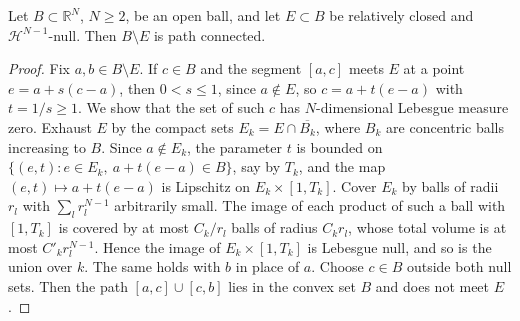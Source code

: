 \begin{lemma}\label{lem:thin-set-path-connectivity}
Let $B\subset\mathbb R^N$, $N\geq2$, be an open ball, and let $E\subset B$ be relatively closed and $\mathcal H^{N-1}$-null. Then $B\setminus E$ is path connected.
\end{lemma}
\begin{proof}
Fix $a,b\in B\setminus E$. If $c\in B$ and the segment $[a,c]$ meets $E$ at a point $e=a+s(c-a)$, then $0<s\leq1$, since $a\notin E$, so $c=a+t(e-a)$ with $t=1/s\geq1$. We show that the set of such $c$ has $N$-dimensional Lebesgue measure zero. Exhaust $E$ by the compact sets $E_k=E\cap\overline{B_k}$, where $B_k$ are concentric balls increasing to $B$. Since $a\notin E_k$, the parameter $t$ is bounded on $\{(e,t):e\in E_k,\ a+t(e-a)\in B\}$, say by $T_k$, and the map $(e,t)\mapsto a+t(e-a)$ is Lipschitz on $E_k\times[1,T_k]$. Cover $E_k$ by balls of radii $r_l$ with $\sum_lr_l^{N-1}$ arbitrarily small. The image of each product of such a ball with $[1,T_k]$ is covered by at most $C_k/r_l$ balls of radius $C_kr_l$, whose total volume is at most $C'_kr_l^{N-1}$. Hence the image of $E_k\times[1,T_k]$ is Lebesgue null, and so is the union over $k$. The same holds with $b$ in place of $a$. Choose $c\in B$ outside both null sets. Then the path $[a,c]\cup[c,b]$ lies in the convex set $B$ and does not meet $E$.
\end{proof}

